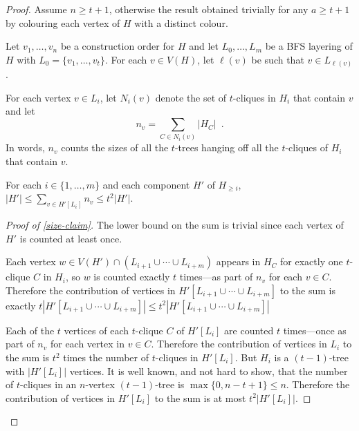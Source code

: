 \documentclass[kpfonts]{patmorin}
\theoremstyle{named}
\begin{document}
\begin{proof}
    Assume $n\ge t+1$, otherwise the result obtained trivially for any $a\ge t+1$ by colouring each vertex of $H$ with a distinct colour.

    Let $v_1,\ldots,v_n$ be a construction order for $H$ and let $L_0,\ldots,L_m$ be a BFS layering of $H$ with $L_0=\{v_1,\ldots,v_t\}$.  For each $v\in V(H)$, let $\ell(v)$ be such that $v\in L_{\ell(v)}$.

    For each vertex $v\in L_i$, let $N_i(v)$ denote the set of $t$-cliques in $H_i$ that contain $v$ and let
    \begin{equation}
        n_v=\sum_{C\in N_i(v)}|H_{C}| \enspace . \label{nv}
    \end{equation}
    In words, $n_v$ counts the sizes of all the $t$-trees hanging off all the $t$-cliques of $H_i$ that contain $v$.

    \begin{clm}\label{size-claim}
        For each $i\in\{1,\ldots,m\}$ and each component $H'$ of $H_{\ge i}$, $|H'|\le \sum_{v\in H'[L_i]} n_v \le t^2|H'|$.
    \end{clm}

    \begin{proof}[Proof of \cref{size-claim}]
        The lower bound on the sum is trivial since each vertex of $H'$ is counted at least once.

        Each vertex $w\in V(H')\cap(L_{i+1}\cup\cdots\cup L_{i+m})$ appears in $H_C$ for exactly one $t$-clique $C$ in $H_i$, so $w$ is counted exactly $t$ times---as part of $n_v$ for each $v\in C$. Therefore the contribution of vertices in $H'[L_{i+1}\cup\cdots\cup L_{i+m}]$ to the sum is exactly $t|H'[L_{i+1}\cup\cdots\cup L_{i+m}]|\le t^2|H'[L_{i+1}\cup\cdots\cup L_{i+m}]|$

        Each of the $t$ vertices of each $t$-clique $C$ of $H'[L_i]$ are counted $t$ times---once as part of $n_v$ for each vertex in $v\in C$. Therefore the contribution of vertices in $L_i$ to the sum is $t^2$ times the number of $t$-cliques in $H'[L_i]$.  But $H_i$ is a $(t-1)$-tree with $|H'[L_i]|$ vertices.  It is well known, and not hard to show, that the number of $t$-cliques in an $n$-vertex $(t-1)$-tree is $\max\{0,n-t+1\}\le n$. Therefore the contribution of vertices in $H'[L_i]$ to the sum is at most $t^2|H'[L_i]|$.


\end{proof}
\end{proof}
\end{document}
